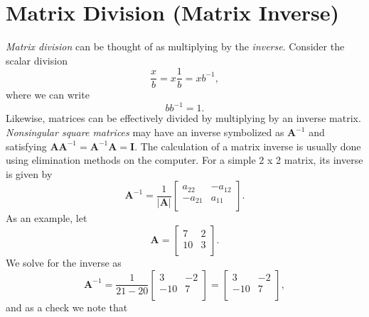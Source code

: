 \section{Matrix Division (Matrix Inverse)}
\emph{Matrix division} can be thought of as multiplying by the \emph{inverse}.  Consider the scalar division
\begin{equation}
\frac{x}{b}=x\frac{1}{b}=xb^{-1},
\end{equation}	 
where we can write
\begin{equation}
bb^{-1}=1.
\end{equation}
Likewise, matrices can be effectively divided by multiplying by an inverse matrix. \emph{Nonsingular square 
matrices} may have an inverse symbolized as $\mathbf{A}^{-1}$ and satisfying $\mathbf{AA}^{-1} = \mathbf{A}^{-1}\mathbf{A} = \mathbf{I}$.
The calculation of a matrix inverse is usually done using elimination methods on the computer.
For a simple 2 x 2 matrix, its inverse is given by
\begin{equation}
\mathbf{A}^{-1} = \frac{1}{|\mathbf{A}|}   
\left [ \begin{array}{cc} a_{22} & -a_{12} \\
-a_{21} & a_{11} \\
\end{array}
\right ] .
\end{equation}
	 As an example, let
\begin{equation}
\mathbf{A}=
\left [\begin{array}{cc} 7 & 2\\
10 & 3\\
\end{array}
\right].
\end{equation}
We solve for the inverse as
\begin{equation}
\mathbf{A}^{-1}=\frac{1}{21-20}
\left [\begin{array}{cc}3 & -2\\
 -10 & 7\\
\end{array}
\right]=
\left [\begin{array}{cc}3 & -2\\
-10 & 7\\
\end{array}
\right],
\end{equation}
and as a check we note that
